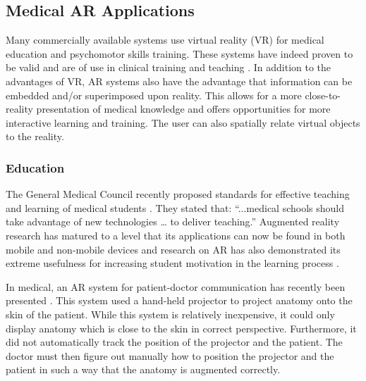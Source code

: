 \subsection{Medical AR Applications}
Many commercially available systems use virtual reality (VR) for medical education and psychomotor skills training. These systems have indeed proven to be valid and are of use in clinical training and teaching \cite{Lewis2011,Thijssen2010,VanDongen2011}. In addition to the advantages of VR, AR systems also have the advantage that information can be embedded and/or superimposed upon reality. This allows for a more close-to-reality presentation of medical knowledge and offers opportunities for more interactive learning and training. The user can also spatially relate virtual objects to the reality. 

\subsubsection{Education}
The General Medical Council recently proposed standards for effective teaching and learning of medical students \cite{Council2009}. They stated that: ``...medical schools should take advantage of new technologies … to deliver teaching.'' 
Augmented reality research has matured to a level that its applications can now be found in both mobile and non-mobile devices \cite{Bacca2014} and research on AR has also demonstrated its extreme usefulness for increasing student motivation in the learning process \cite{Chang2014,DiSerio2013}.

In medical, an AR system for patient-doctor communication has recently been presented \cite{Ni2011}. This system used a hand-held projector to project anatomy onto the skin of the patient. While this system is relatively inexpensive, it could only display anatomy which is close to the skin in correct perspective. Furthermore, it did not automatically track the position of the projector and the patient. The doctor must then figure out manually how to position the projector and the patient in such a way that the anatomy is augmented correctly.

